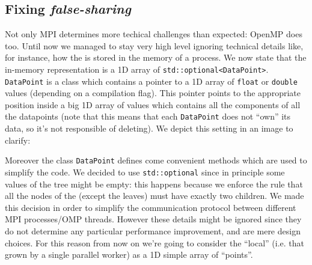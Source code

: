 \documentclass{article}
\begin{document}
\subsection{Fixing \emph{false-sharing}} \label{sec:false_sharing}
Not only MPI determines more techical challenges than expected: OpenMP does too.
Until now we managed to stay very high level ignoring technical details
like, for instance, how the \kdtree{} is stored in the memory of a process. We
now state that the in-memory representation is a 1D array of
\texttt{std::optional<DataPoint>}. \texttt{DataPoint} is a class which contains
a pointer to a 1D array of \texttt{float} or \texttt{double} values (depending
on a compilation flag). This pointer points to the appropriate position inside a
big 1D array of values which contains all the components of all the datapoints
(note that this means that each \texttt{DataPoint} does not ``own'' its data, so
it's not responsible of deleting). We depict this setting in an image to
clarify:
\begin{figure}[H]
    \centering
\end{figure}

Moreover the class \texttt{DataPoint} defines come convenient methods which are
used to simplify the code. We decided to use \texttt{std::optional} since in
principle some values of the tree might be empty: this happens because we
enforce the rule that all the nodes of the \kdtree{} (except the leaves) must
have exactly two children. We made this decision in order to simplify the
communication protocol between different MPI processes/OMP threads. However
these details might be ignored since they do not determine any particular
performance improvement, and are mere design choices. For this reason from now
on we're going to consider the ``local'' \kdtree{} (i.e. that grown by a single
parallel worker) as a 1D simple array of ``points''.
\end{document}
